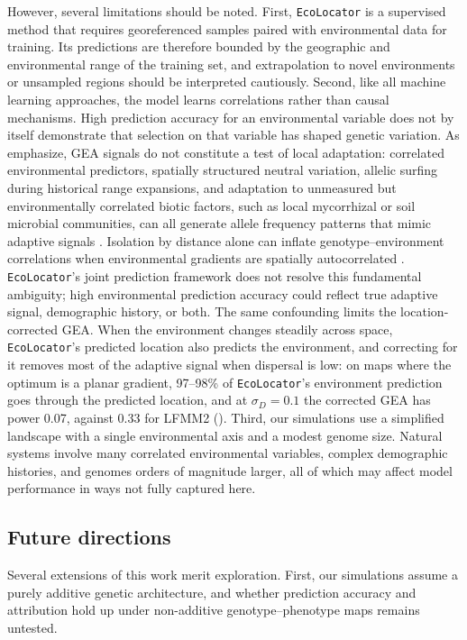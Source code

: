 \documentclass[]{article}
\newcommand{\ecolocator}{\texttt{EcoLocator}\xspace}
\providecommand{\llabel}[1]{}%
\begin{document}
However, several limitations should be noted.
First, \ecolocator is a supervised method
that requires georeferenced samples paired
with environmental data for training.
Its predictions are therefore bounded
by the geographic and environmental range of the training set,
and extrapolation to novel environments
or unsampled regions should be interpreted cautiously.
Second, like all machine learning approaches,
the model learns correlations rather than causal mechanisms.
High prediction accuracy for an environmental variable
does not by itself demonstrate that selection
on that variable has shaped genetic variation.
As \citet{booker_wza_2024} emphasize,
GEA signals do not constitute a test of local adaptation:
correlated environmental predictors,
spatially structured neutral variation,
allelic surfing during historical range expansions,
and adaptation to unmeasured but environmentally correlated biotic
factors, such as local mycorrhizal or soil microbial communities,
can all generate allele frequency patterns
that mimic adaptive signals
\citep{klopfstein_surfing_2006, novembre_spatial_2009}.
Isolation by distance alone can inflate
genotype--environment correlations
when environmental gradients are spatially autocorrelated
\citep{meirmans_ibd_2012}.
\ecolocator's joint prediction framework
does not resolve this fundamental ambiguity;
high environmental prediction accuracy
could reflect true adaptive signal, demographic history,
or both.
The same confounding limits the location-corrected GEA.\llabel{gradientlimit}
When the environment changes steadily across space,
\ecolocator's predicted location also predicts the environment,
and correcting for it removes most of the adaptive signal
when dispersal is low:
on maps where the optimum is a planar gradient,
97--98\% of \ecolocator's environment prediction goes through
the predicted location,
and at $\sigma_D = 0.1$ the corrected GEA has power 0.07,
against 0.33 for LFMM2 ().
Third, our simulations use a simplified landscape
with a single environmental axis
and a modest genome size.
Natural systems involve many correlated environmental variables,
complex demographic histories,
and genomes orders of magnitude larger,
all of which may affect model performance in ways
not fully captured here.

\subsection{Future directions}

Several extensions of this work merit exploration.
First, our simulations assume a purely additive genetic architecture,
and whether prediction accuracy and attribution hold up under
non-additive genotype--phenotype maps remains untested.
\end{document}

